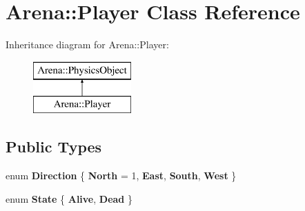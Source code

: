 \hypertarget{class_arena_1_1_player}{\section{Arena\+:\+:Player Class Reference}
\label{class_arena_1_1_player}
}
Inheritance diagram for Arena\+:\+:Player\+:\begin{figure}[H]
\begin{center}
\leavevmode
\includegraphics[height=2.000000cm]{class_arena_1_1_player}
\end{center}
\end{figure}
\subsection*{Public Types}
\begin{DoxyCompactItemize}
\item 
\hypertarget{class_arena_1_1_player_a4f0bbae55a9ca69f6766c86af851843b}{enum {\bfseries Direction} \{ {\bfseries North} = 1, 
{\bfseries East}, 
{\bfseries South}, 
{\bfseries West}
 \}}\label{class_arena_1_1_player_a4f0bbae55a9ca69f6766c86af851843b}

\item 
\hypertarget{class_arena_1_1_player_a840d249fa3c4b97afe536126d5b272f6}{enum {\bfseries State} \{ {\bfseries Alive}, 
{\bfseries Dead}
 \}}\label{class_arena_1_1_player_a840d249fa3c4b97afe536126d5b272f6}

\end{DoxyCompactItemize}
